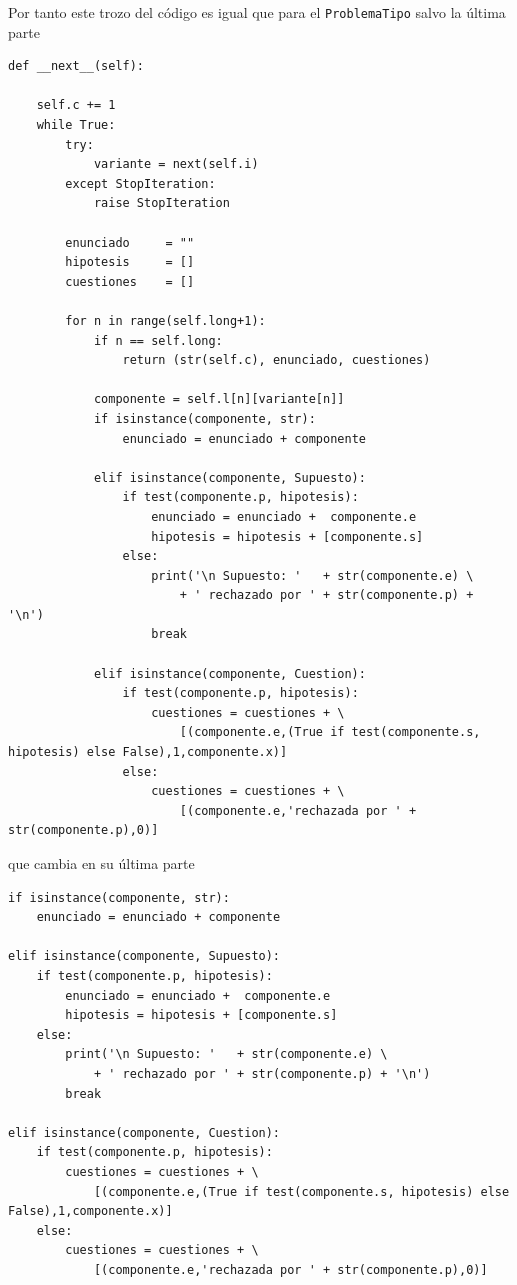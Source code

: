 \documentclass[10pt,a4paper]{report}
\begin{document}
Por tanto este trozo del código es igual que para el \texttt{ProblemaTipo} salvo la última parte
\begin{verbatim}
def __next__(self):

    self.c += 1
    while True:
        try:
            variante = next(self.i)
        except StopIteration:
            raise StopIteration

        enunciado     = ""
        hipotesis     = []
        cuestiones    = []

        for n in range(self.long+1):
            if n == self.long:
                return (str(self.c), enunciado, cuestiones)

            componente = self.l[n][variante[n]]
            if isinstance(componente, str):
                enunciado = enunciado + componente
            
            elif isinstance(componente, Supuesto):
                if test(componente.p, hipotesis):
                    enunciado = enunciado +  componente.e
                    hipotesis = hipotesis + [componente.s]
                else:
                    print('\n Supuesto: '   + str(componente.e) \
                        + ' rechazado por ' + str(componente.p) + '\n')
                    break
            
            elif isinstance(componente, Cuestion):
                if test(componente.p, hipotesis):
                    cuestiones = cuestiones + \
                        [(componente.e,(True if test(componente.s, hipotesis) else False),1,componente.x)]
                else:
                    cuestiones = cuestiones + \
                        [(componente.e,'rechazada por ' + str(componente.p),0)]
\end{verbatim}
que cambia en su última parte
\begin{verbatim}
if isinstance(componente, str):
    enunciado = enunciado + componente

elif isinstance(componente, Supuesto):
    if test(componente.p, hipotesis):
        enunciado = enunciado +  componente.e
        hipotesis = hipotesis + [componente.s]
    else:
        print('\n Supuesto: '   + str(componente.e) \
            + ' rechazado por ' + str(componente.p) + '\n')
        break

elif isinstance(componente, Cuestion):
    if test(componente.p, hipotesis):
        cuestiones = cuestiones + \
            [(componente.e,(True if test(componente.s, hipotesis) else False),1,componente.x)]
    else:
        cuestiones = cuestiones + \
            [(componente.e,'rechazada por ' + str(componente.p),0)]
\end{verbatim}
\end{document}
